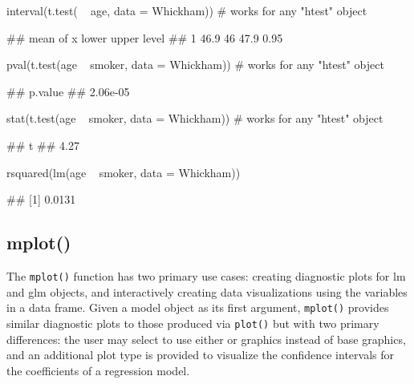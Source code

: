 \begin{Schunk}
\begin{Sinput}
interval(t.test( ~ age, data = Whickham))      # works for any "htest" object
\end{Sinput}
\begin{Soutput}
##   mean of x lower upper level
## 1      46.9    46  47.9  0.95
\end{Soutput}
\begin{Sinput}
pval(t.test(age ~ smoker, data = Whickham))    # works for any "htest" object
\end{Sinput}
\begin{Soutput}
##  p.value 
## 2.06e-05
\end{Soutput}
\begin{Sinput}
stat(t.test(age ~ smoker, data = Whickham))    # works for any "htest" object
\end{Sinput}
\begin{Soutput}
##    t 
## 4.27
\end{Soutput}
\begin{Sinput}
rsquared(lm(age ~ smoker, data = Whickham))
\end{Sinput}
\begin{Soutput}
## [1] 0.0131
\end{Soutput}
\end{Schunk}

\subsection{mplot()}\label{mplot}

The \texttt{mplot()} function has two primary use cases: creating
diagnostic plots for lm and glm objects, and interactively creating data
visualizations using the variables in a data frame. Given a model object
as its first argument, \texttt{mplot()} provides similar diagnostic
plots to those produced via \texttt{plot()} but with two primary
differences: the user may select to use either  or
 \citep{ggplot2} graphics instead of base graphics, and
an additional plot type is provided to visualize the confidence
intervals for the coefficients of a regression model.


